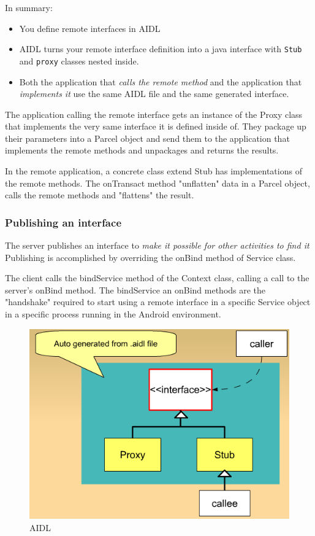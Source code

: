 \documentclass[11pt, a4paper]{book}
\begin{document}
In summary:
\begin{itemize}
    \item You define remote interfaces in AIDL
    \item AIDL turns your remote interface definition into a java
        interface with \verb|Stub| and \verb|proxy| classes nested
        inside.
    \item Both the application that \emph{calls the remote method} and the
        application that \emph{implements it} use the same AIDL file and the
        same generated interface.
\end{itemize}
The application calling the remote interface gets an instance of the Proxy class
that implements the very same interface it is defined inside of. They package up
their parameters into a Parcel object and send them to the application that
implements the remote methods and unpackages and returns the results.

In the remote application, a concrete class extend Stub has implementations of
the remote methods. The onTransact method "unflatten" data in a Parcel object,
calls the remote methods and "flattens" the result.

\subsubsection{Publishing an interface}
The server publishes an interface to \emph{make it possible for other activities
to find it} Publishing is accomplished by overriding the onBind method of
Service class.

The client calls the bindService method of the Context class, calling a call to
the server's onBind method. The bindService an onBind methods are the
"handshake" required to start using a remote interface in a specific Service
object in a specific process running in the Android environment. 
\begin{figure}
    \centering
    \includegraphics[scale=0.5]{AIDL.png}
    \caption{AIDL}
\end{figure}
\end{document}

